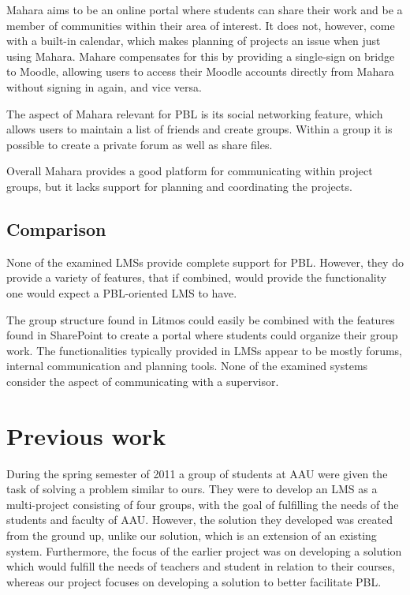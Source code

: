 Mahara aims to be an online portal where students can share their work and be a member of communities within their area of interest.
It does not, however, come with a built-in calendar, which makes planning of projects an issue when just using Mahara.
Mahare compensates for this by providing a single-sign on bridge to Moodle, allowing users to access their Moodle accounts directly from Mahara without signing in again, and vice versa.

The aspect of Mahara relevant for PBL is its social networking feature, which allows users to maintain a list of friends and create groups.
Within a group it is possible to create a private forum as well as share files.

Overall Mahara provides a good platform for communicating within project groups, but it lacks support for planning and coordinating the projects.

\subsection{Comparison}
None of the examined LMSs provide complete support for PBL.
However, they do provide a variety of features, that if combined, would provide the functionality one would expect a PBL-oriented LMS to have.

The group structure found in Litmos could easily be combined with the features found in SharePoint to create a portal where students could organize their group work.
The functionalities typically provided in LMSs appear to be mostly forums, internal communication and planning tools.
None of the examined systems consider the aspect of communicating with a supervisor.

\section{Previous work}
During the spring semester of 2011 a group of students at AAU were given the task of solving a problem similar to ours. 
They were to develop an LMS as a multi-project consisting of four groups, with the goal of fulfilling the needs of the students and faculty of AAU.
However, the solution they developed was created from the ground up, unlike our solution, which is an extension of an existing system.
Furthermore, the focus of the earlier project was on developing a solution which would fulfill the needs of teachers and student in relation to their courses, whereas our project focuses on developing a solution to better facilitate PBL. 

